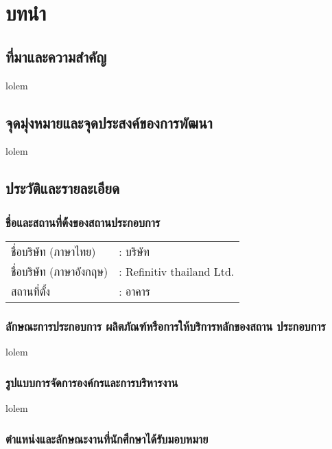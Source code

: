\chapter{บทนำ}
\label{chapter:introduction}

\section{ที่มาและความสำคัญ}

lolem

\section{จุดมุ่งหมายและจุดประสงค์ของการพัฒนา}
lolem

\section{ประวัติและรายละเอียด}

\subsection{ชื่อและสถานที่ต้้งของสถานประกอบการ}
\begin{table}[]
    \begin{tabularx}{\linewidth}{ll}
    ชื่อบริษัท (ภาษาไทย) & : บริษัท  \\
    ชื่อบริษัท (ภาษาอังกฤษ) & : Refinitiv thailand Ltd. \\
    สถานที่ตั้ง  & : อาคาร \\
    \end{tabularx}
\end{table}


\subsection{ลักษณะการประกอบการ ผลิตภัณฑ์หรือการให้บริการหลักของสถาน ประกอบการ}
lolem

\subsection{รูปแบบการจัดการองค์กรและการบริหารงาน}
lolem

\subsection{ตำแหน่งและลักษณะงานที่นักศึกษาได้รับมอบหมาย}

